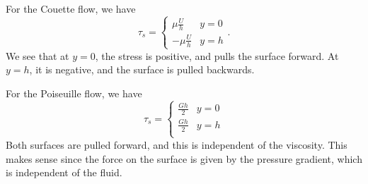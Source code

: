 \documentclass[a4paper]{article}
\begin{document}
\begin{eg}
  For the Couette flow, we have
  \[
    \tau_s =
    \begin{cases}
      \mu \frac{U}{h} & y = 0\\
      -\mu \frac{U}{h} & y = h
    \end{cases}.
  \]
  We see that at $y = 0$, the stress is positive, and pulls the surface forward. At $y = h$, it is negative, and the surface is pulled backwards.

  For the Poiseuille flow, we have
  \[
    \tau_s =
    \begin{cases}
      \frac{Gh}{2} & y = 0\\
      \frac{Gh}{2} & y = h\\
    \end{cases}
  \]
  Both surfaces are pulled forward, and this is independent of the viscosity. This makes sense since the force on the surface is given by the pressure gradient, which is independent of the fluid.
\end{eg}
\end{document}
